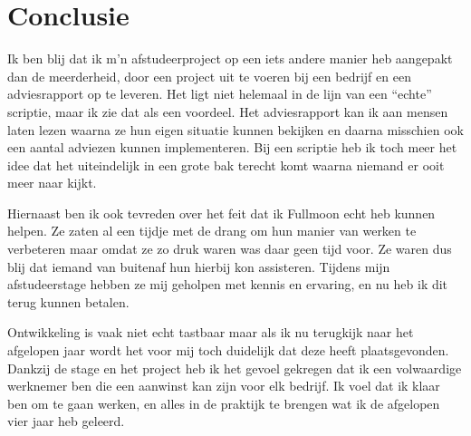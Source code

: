 \chapter{Conclusie}

Ik ben blij dat ik m'n afstudeerproject op een iets andere manier heb aangepakt dan de meerderheid, door een project uit te voeren bij een bedrijf en een adviesrapport op te leveren. Het ligt niet helemaal in de lijn van een ``echte'' scriptie, maar ik zie dat als een voordeel. Het adviesrapport kan ik aan mensen laten lezen waarna ze hun eigen situatie kunnen bekijken en daarna misschien ook een aantal adviezen kunnen implementeren. Bij een scriptie heb ik toch meer het idee dat het uiteindelijk in een grote bak terecht komt waarna niemand er ooit meer naar kijkt.

Hiernaast ben ik ook tevreden over het feit dat ik Fullmoon echt heb kunnen helpen. Ze zaten al een tijdje met de drang om hun manier van werken te verbeteren maar omdat ze zo druk waren was daar geen tijd voor. Ze waren dus blij dat iemand van buitenaf hun hierbij kon assisteren. Tijdens mijn afstudeerstage hebben ze mij geholpen met kennis en ervaring, en nu heb ik dit terug kunnen betalen.

Ontwikkeling is vaak niet echt tastbaar maar als ik nu terugkijk naar het afgelopen jaar wordt het voor mij toch duidelijk dat deze heeft plaatsgevonden. Dankzij de stage en het project heb ik het gevoel gekregen dat ik een volwaardige werknemer ben die een aanwinst kan zijn voor elk bedrijf. Ik voel dat ik klaar ben om te gaan werken, en alles in de praktijk te brengen wat ik de afgelopen vier jaar heb geleerd.